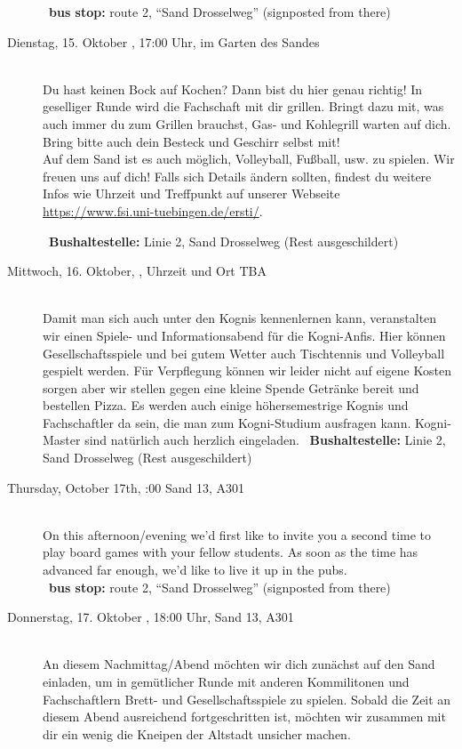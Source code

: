 \begin{description}
	~\textbf{bus stop:} route 2, "`Sand Drosselweg"' (signposted from there)
\else
	\item[Dienstag, 15. Oktober \YEAR, 17:00 Uhr, im Garten des Sandes ]\ \\
	Du hast keinen Bock auf Kochen? Dann bist du hier genau richtig! In geselliger Runde wird die Fachschaft mit dir grillen. Bringt dazu mit, was auch immer du zum Grillen brauchst, Gas- und Kohlegrill warten auf dich. Bring bitte auch dein Besteck und Geschirr selbst mit!\\
	 Auf dem Sand ist es auch möglich, Volleyball, Fußball, usw. zu spielen. Wir freuen uns auf dich!
	Falls sich Details ändern sollten, findest du weitere Infos wie Uhrzeit und Treffpunkt auf unserer Webseite \url{https://www.fsi.uni-tuebingen.de/ersti/}.

	~\textbf{Bushaltestelle:} Linie 2, Sand Drosselweg (Rest ausgeschildert)
\fi

\ifkogwiss
    \item[Mittwoch, 16. Oktober, \YEAR, Uhrzeit und Ort TBA]\ \\
         Damit man sich auch unter den Kognis kennenlernen kann, veranstalten wir einen Spiele- und Informationsabend für die Kogni-Anfis. Hier können Gesellschaftsspiele und bei gutem Wetter auch Tischtennis und Volleyball gespielt werden. Für Verpflegung können wir leider nicht auf eigene Kosten sorgen aber wir stellen gegen eine kleine Spende Getränke bereit und bestellen Pizza. Es werden auch einige höhersemestrige Kognis und Fachschaftler da sein, die man zum Kogni-Studium ausfragen kann. Kogni-Master sind natürlich auch herzlich eingeladen.
	~\textbf{Bushaltestelle:} Linie 2, Sand Drosselweg (Rest ausgeschildert)
\fi


\ifml
    \item[Thursday, October 17th, \YEAR 18:00 Sand 13, A301]\ \\
        On this afternoon/evening we'd first like to invite you a second time to play board games with your fellow students. As soon as the time has advanced far enough, we'd like to live it up in the pubs.\\
	~\textbf{bus stop:} route 2, "`Sand Drosselweg"' (signposted from there)
\else
    \item[Donnerstag, 17. Oktober \YEAR, 18:00 Uhr, Sand 13, A301]\ \\
An diesem Nachmittag/Abend möchten wir dich zunächst auf den Sand einladen, um in gemütlicher Runde mit anderen Kommilitonen und Fachschaftlern Brett- und Gesellschaftsspiele zu spielen. Sobald die Zeit an diesem Abend ausreichend fortgeschritten ist, möchten wir zusammen mit dir ein wenig die Kneipen der Altstadt unsicher machen.


\end{description}

